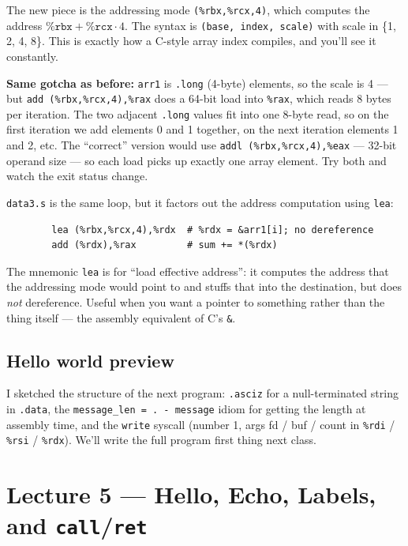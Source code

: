 \documentclass[11pt]{article}
\begin{document}
The new piece is the addressing mode \texttt{(\%rbx,\%rcx,4)}, which
computes the address $\texttt{\%rbx} + \texttt{\%rcx} \cdot 4$. The
syntax is \texttt{(base, index, scale)} with scale in \{1, 2, 4, 8\}.
This is exactly how a C-style array index compiles, and you'll see
it constantly.

\textbf{Same gotcha as before:} \texttt{arr1} is \texttt{.long}
(4-byte) elements, so the scale is 4 --- but \texttt{add
(\%rbx,\%rcx,4),\%rax} does a 64-bit load into \texttt{\%rax}, which
reads 8 bytes per iteration. The two adjacent \texttt{.long} values
fit into one 8-byte read, so on the first iteration we add elements
0 and 1 together, on the next iteration elements 1 and 2, etc. The
``correct'' version would use \texttt{addl (\%rbx,\%rcx,4),\%eax} ---
32-bit operand size --- so each load picks up exactly one
array element. Try both and watch the exit status change.

\texttt{data3.s} is the same loop, but it factors out the address
computation using \texttt{lea}:

\begin{lstlisting}
        lea (%rbx,%rcx,4),%rdx  # %rdx = &arr1[i]; no dereference
        add (%rdx),%rax         # sum += *(%rdx)
\end{lstlisting}

The mnemonic \texttt{lea} is for ``load effective address'': it
computes the address that the addressing mode would point to and
stuffs that into the destination, but does \emph{not} dereference.
Useful when you want a pointer to something rather than the thing
itself --- the assembly equivalent of C's \texttt{\&}.

\subsection*{Hello world preview}

I sketched the structure of the next program: \texttt{.asciz} for a
null-terminated string in \texttt{.data}, the \texttt{message\_len =
. - message} idiom for getting the length at assembly time, and the
\texttt{write} syscall (number 1, args fd / buf / count in
\texttt{\%rdi} / \texttt{\%rsi} / \texttt{\%rdx}). We'll write the
full program first thing next class.

\section{Lecture 5 --- Hello, Echo, Labels, and \texttt{call}/\texttt{ret}}
\end{document}
